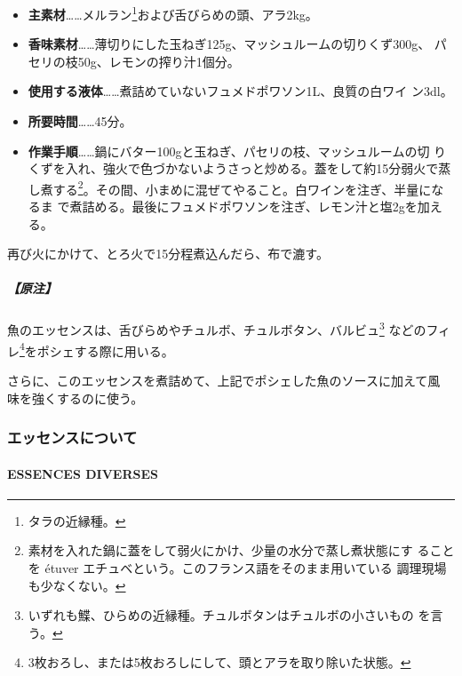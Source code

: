 \begin{recette}
\begin{itemize}
\item
  \textbf{主素材}\ldots{}\ldots{}メルラン\footnote{タラの近縁種。}および舌びらめの頭、アラ2kg。
\item
  \textbf{香味素材}\ldots{}\ldots{}薄切りにした玉ねぎ125g、マッシュルームの切りくず300g、
  パセリの枝50g、レモンの搾り汁1個分。
\item
  \textbf{使用する液体}\ldots{}\ldots{}煮詰めていないフュメドポワソン1\undemi{}L、良質の白ワイ
  ン3dl。
\item
  \textbf{所要時間}\ldots{}\ldots{}45分。
\item
  \textbf{作業手順}\ldots{}\ldots{}鍋にバター100gと玉ねぎ、パセリの枝、マッシュルームの切
  りくずを入れ、強火で色づかないようさっと炒める。蓋をして約15分弱火で蒸
  し煮する\footnote{素材を入れた鍋に蓋をして弱火にかけ、少量の水分で蒸し煮状態にす
    ることを étuver エチュベという。このフランス語をそのまま用いている
    調理現場も少なくない。}。その間、小まめに混ぜてやること。白ワインを注ぎ、半量になるま
  で煮詰める。最後にフュメドポワソンを注ぎ、レモン汁と塩2gを加える。
\end{itemize}

再び火にかけて、とろ火で15分程煮込んだら、布で漉す。

\hypertarget{ux539fux6ce8-4}{%
\subparagraph{【原注】}\label{ux539fux6ce8-4}}

魚のエッセンスは、舌びらめやチュルボ、チュルボタン、バルビュ\footnote{いずれも鰈、ひらめの近縁種。チュルボタンはチュルボの小さいもの
  を言う。} などのフィレ\footnote{3枚おろし、または5枚おろしにして、頭とアラを取り除いた状態。}をポシェする際に用いる。

さらに、このエッセンスを煮詰めて、上記でポシェした魚のソースに加えて風
味を強くするのに使う。

\maeaki

\hypertarget{ux30a8ux30c3ux30bbux30f3ux30b9ux306bux3064ux3044ux3066}{%
\subsubsection{エッセンスについて}\label{ux30a8ux30c3ux30bbux30f3ux30b9ux306bux3064ux3044ux3066}}

\hypertarget{essences-diverses}{%
\paragraph{ESSENCES DIVERSES}\label{essences-diverses}}



\end{recette}
